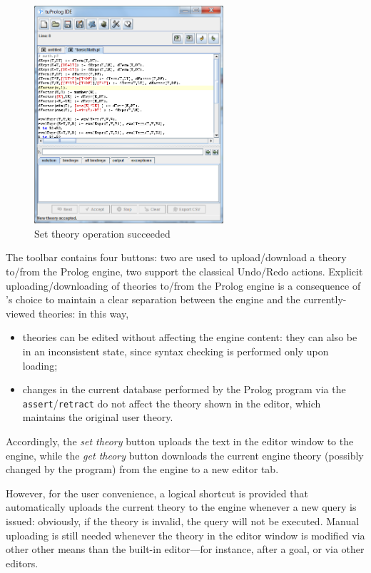 \begin{figure}
\centering
\includegraphics[width=7cm]{images/setTheorySucceeded}
\caption{Set theory operation succeeded}
\label{fig:set-theory-succeeded}
\end{figure}

The toolbar contains four buttons: two are used to upload/download a theory to/from the Prolog engine, two support the classical Undo/Redo actions.
%
Explicit uploading/downloading of theories to/from the Prolog engine is a consequence of \tuprolog{}'s choice to maintain a clear separation between the engine and the currently-viewed theories: in this way, 
\begin{itemize}
  \item theories can be edited without affecting the engine content: they can also be in an inconsistent state, since syntax checking is performed only upon loading;
  \item changes in the current database performed by the Prolog program via the \texttt{assert}/\texttt{retract} do not affect the theory shown in the editor, which maintains the original user theory.
\end{itemize}
%
Accordingly, the \textit{set theory} button uploads the text in the editor window to the engine, while the \textit{get theory} button downloads the current engine theory (possibly changed by the program) from the engine to a new editor tab.

However, for the user convenience, a logical shortcut is provided that automatically uploads the current theory to the engine whenever a new query is issued: obviously, if the theory is invalid, the query will not be executed.
%
Manual uploading is still needed whenever the theory in the editor window is modified via other other means than the built-in editor---for instance, after a  goal, or via other editors.

